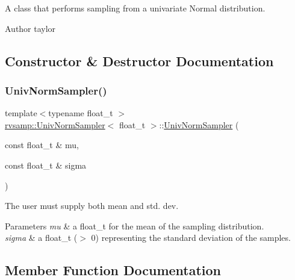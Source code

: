 A class that performs sampling from a univariate Normal distribution. 

\begin{DoxyAuthor}{Author}
taylor 
\end{DoxyAuthor}


\subsection{Constructor \& Destructor Documentation}
\mbox{\label{classrvsamp_1_1UnivNormSampler_abf9480e20a20e83f35933dcad1360117}} 
\subsubsection{\texorpdfstring{Univ\+Norm\+Sampler()}{UnivNormSampler()}}
{\footnotesize\ttfamily template$<$typename float\+\_\+t $>$ \\
\hyperlink{classrvsamp_1_1UnivNormSampler}{rvsamp\+::\+Univ\+Norm\+Sampler}$<$ float\+\_\+t $>$\+::\hyperlink{classrvsamp_1_1UnivNormSampler}{Univ\+Norm\+Sampler} (\begin{DoxyParamCaption}\item[{const float\+\_\+t \&}]{mu,  }\item[{const float\+\_\+t \&}]{sigma }\end{DoxyParamCaption})}



The user must supply both mean and std. dev. 


\begin{DoxyParams}{Parameters}
{\em mu} & a float\+\_\+t for the mean of the sampling distribution. \\
\hline
{\em sigma} & a float\+\_\+t ($>$ 0) representing the standard deviation of the samples. \\
\hline
\end{DoxyParams}


\subsection{Member Function Documentation}
\mbox{\label{classrvsamp_1_1UnivNormSampler_a67416efdbb1569a068d5a5a4914e27a1}} 
